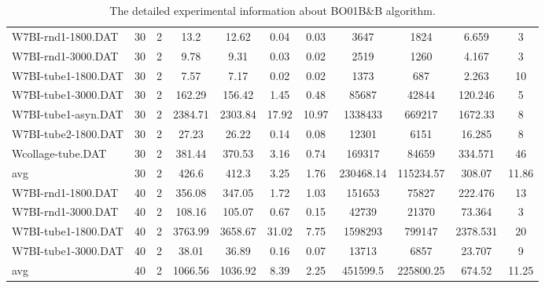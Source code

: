 \begin{table}[!h]
{\begin{tabular}{lcccccccccc}
W7BI-rnd1-1800.DAT & 30 & 2 & 13.2 & 12.62 & 0.04 & 0.03 & 3647 & 1824 & 6.659 & 3\\
W7BI-rnd1-3000.DAT & 30 & 2 & 9.78 & 9.31 & 0.03 & 0.02 & 2519 & 1260 & 4.167 & 3\\
W7BI-tube1-1800.DAT & 30 & 2 & 7.57 & 7.17 & 0.02 & 0.02 & 1373 & 687 & 2.263 & 10\\
W7BI-tube1-3000.DAT & 30 & 2 & 162.29 & 156.42 & 1.45 & 0.48 & 85687 & 42844 & 120.246 & 5\\
W7BI-tube1-asyn.DAT & 30 & 2 & 2384.71 & 2303.84 & 17.92 & 10.97 & 1338433 & 669217 & 1672.33 & 8\\
W7BI-tube2-1800.DAT & 30 & 2 & 27.23 & 26.22 & 0.14 & 0.08 & 12301 & 6151 & 16.285 & 8\\
Wcollage-tube.DAT & 30 & 2 & 381.44 & 370.53 & 3.16 & 0.74 & 169317 & 84659 & 334.571 & 46\\
avg & 30 & 2 & 426.6  &  412.3 & 3.25 & 1.76 & 230468.14 & 115234.57 & 308.07 & 11.86 \\
W7BI-rnd1-1800.DAT & 40 & 2 & 356.08 & 347.05 & 1.72 & 1.03 & 151653 & 75827 & 222.476 & 13\\
W7BI-rnd1-3000.DAT & 40 & 2 & 108.16 & 105.07 & 0.67 & 0.15 & 42739 & 21370 & 73.364 & 3\\
W7BI-tube1-1800.DAT & 40 & 2 & 3763.99 & 3658.67 & 31.02 & 7.75 & 1598293 & 799147 & 2378.531 & 20\\
W7BI-tube1-3000.DAT & 40 & 2 & 38.01 & 36.89 & 0.16 & 0.07 & 13713 & 6857 & 23.707 & 9\\
avg & 40 & 2 & 1066.56  &  1036.92 & 8.39 & 2.25 & 451599.5 & 225800.25 & 674.52 & 11.25 \\
\bottomrule
\end{tabular}%
}%
\caption{The detailed experimental information about BO01B\&B algorithm.}
\label{tab:table_bb}
\end{table}

